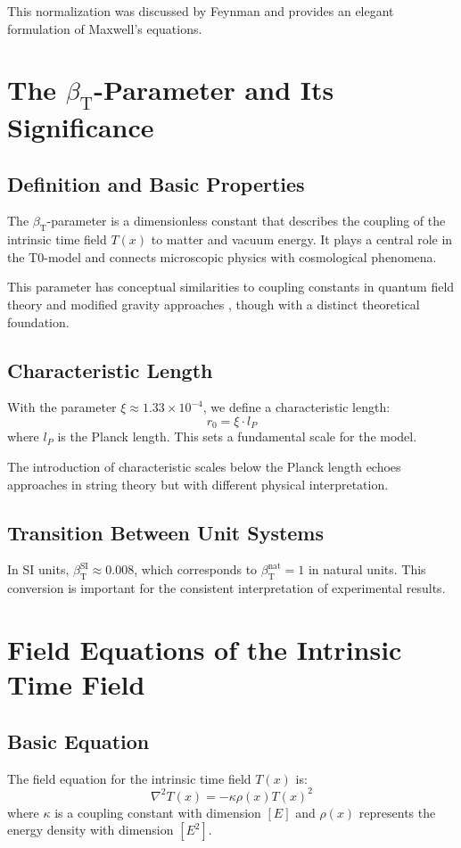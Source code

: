 \documentclass[a4paper,12pt]{article}
\newcommand{\Tfield}{T(x)}
\newcommand{\betaT}{\beta_{\text{T}}}
\begin{document}
	This normalization was discussed by Feynman \cite{Feynman1985} and provides an elegant formulation of Maxwell's equations.
	
	\section{The $\betaT$-Parameter and Its Significance}
	
	\subsection{Definition and Basic Properties}
	The $\betaT$-parameter is a dimensionless constant that describes the coupling of the intrinsic time field $\Tfield$ to matter and vacuum energy. It plays a central role in the T0-model and connects microscopic physics with cosmological phenomena.
	
	This parameter has conceptual similarities to coupling constants in quantum field theory and modified gravity approaches \cite{Clifton2012}, though with a distinct theoretical foundation.
	
	\subsection{Characteristic Length}
	With the parameter $\xi \approx 1.33 \times 10^{-4}$, we define a characteristic length:
	\[
	r_0 = \xi \cdot l_P
	\]
	where $l_P$ is the Planck length. This sets a fundamental scale for the model.
	
	The introduction of characteristic scales below the Planck length echoes approaches in string theory \cite{Polchinski1998} but with different physical interpretation.
	
	\subsection{Transition Between Unit Systems}
	In SI units, $\betaT^{\text{SI}} \approx 0.008$, which corresponds to $\betaT^{\text{nat}} = 1$ in natural units. This conversion is important for the consistent interpretation of experimental results.
	
	\section{Field Equations of the Intrinsic Time Field}
	
	\subsection{Basic Equation}
	The field equation for the intrinsic time field $\Tfield$ is:
	\[
	\nabla^2 \Tfield = -\kappa \rho(x) \Tfield^2
	\]
	where $\kappa$ is a coupling constant with dimension $[E]$ and $\rho(x)$ represents the energy density with dimension $[E^2]$.
	
\end{document}

